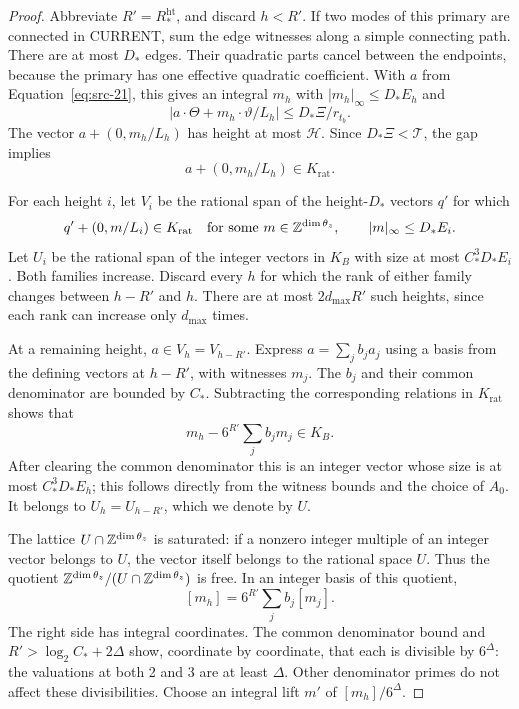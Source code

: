 \begin{proof}
Abbreviate \(R'=R_*^{\mathrm{ht}}\), and discard \(h<R'\).
If two modes of this primary are connected in CURRENT, sum the edge
witnesses along a simple connecting path.  There are at most \(D_*\)
edges.  Their quadratic parts cancel between the endpoints, because
the primary has one effective quadratic coefficient.  With \(a\)
from Equation~\eqref{eq:src-21}, this gives an integral \(m_h\) with
\(|m_h|_\infty\le D_*E_h\) and
\[
 |a\cdot\Theta+m_h\cdot\vartheta/L_h|
                   \le D_*\Xi/r_{t_b}.
\]
The vector \(a+(0,m_h/L_h)\) has height at most \(\mathcal H\).
Since \(D_*\Xi<\mathcal T\), the gap implies
\[
 a+(0,m_h/L_h)\in K_{\mathrm{rat}}.
\]

For each height \(i\), let \(V_i\) be the rational span of the
height-\(D_*\) vectors \(q'\) for which
\[
 q'+(0,m/L_i)\in K_{\mathrm{rat}}
 \quad\hbox{for some }m\in\mathbb Z^{\dim\theta_z},
 \qquad |m|_\infty\le D_*E_i.
\]
Let \(U_i\) be the rational span of the integer vectors in \(K_B\)
with size at most \(C_*^3D_*E_i\).
Both families increase.  Discard every \(h\) for which the rank of
either family changes between \(h-R'\) and \(h\).  There are at most
\(2d_{\max}R'\) such heights, since each rank can increase only
\(d_{\max}\) times.

At a remaining height, \(a\in V_h=V_{h-R'}\).  Express
\(a=\sum_jb_ja_j\) using a basis from the defining vectors at
\(h-R'\), with witnesses \(m_j\).  The \(b_j\) and their common
denominator are bounded by \(C_*\).  Subtracting the corresponding
relations in \(K_{\mathrm{rat}}\) shows that
\[
 m_h-6^{R'}\sum_jb_jm_j\in K_B.
\]
After clearing the common denominator this is an integer vector
whose size is at most \(C_*^3D_*E_h\); this follows directly from the
witness bounds and the choice of \(A_0\).
It belongs to \(U_h=U_{h-R'}\), which we denote by \(U\).

The lattice \(U\cap\mathbb Z^{\dim\theta_z}\) is saturated: if a nonzero
integer multiple of an integer vector belongs to \(U\), the vector
itself belongs to the rational space \(U\).
Thus the quotient
\(\mathbb Z^{\dim\theta_z}/(U\cap\mathbb Z^{\dim\theta_z})\) is free.  In an
integer basis of this quotient,
\[
 [m_h]=6^{R'}\sum_jb_j[m_j].
\]
The right side has integral coordinates.  The common denominator
bound and \(R'>\log_2C_*+2\Delta\) show, coordinate by coordinate,
that each is divisible by \(6^\Delta\): the valuations at both 2
and 3 are at least \(\Delta\).  Other denominator primes do not
affect these divisibilities.  Choose an integral lift \(m'\) of
\([m_h]/6^\Delta\).


\end{proof}
